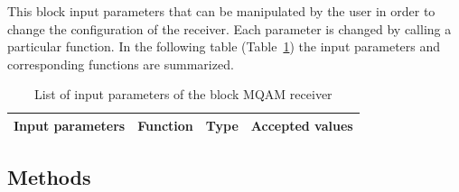 This block input parameters that can be manipulated by the user in 
order to change the configuration of the receiver. Each parameter is changed by 
calling a 
particular function. In the following table 
(Table~\ref{tab:homodyneRx_params}) the input parameters and corresponding 
functions are 
summarized.
%
\begin{table}[h]
	\begin{center}
		\begin{tabular}{| m{} | m{} |  m{} | m{4cm} | }
			\hline
			\textbf{Input parameters} & \textbf{Function} & \textbf{Type} & 
			\textbf{Accepted values} \\ \hline
		\end{tabular}
		\caption{List of input parameters of the block MQAM receiver} 
		\label{tab:homodyneRx_params}
	\end{center}
\end{table}
%

\subsection*{Methods}


